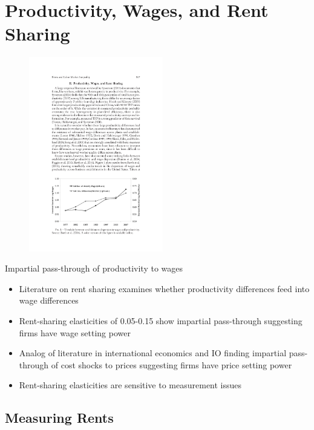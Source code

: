 \documentclass[notes=show]{beamer}
\begin{document}
\section{Productivity, Wages, and Rent Sharing}

\newpage
\begin{center}
\begin{figure}
\includegraphics[height=8.5cm,width=\textwidth]{figures/fig1.pdf}
\end{figure} 
\end{center}
\newpage

\begin{frame}{Impartial pass-through of productivity to wages}
\begin{itemize}
\item Literature on rent sharing examines whether productivity differences feed into wage differences \medskip
\item Rent-sharing elasticities of 0.05-0.15 show impartial pass-through suggesting firms have wage setting power \medskip
\item Analog of literature in international economics and IO finding impartial pass-through of cost shocks to prices suggesting firms have price setting power \medskip
\item Rent-sharing elasticities are sensitive to measurement issues
\end{itemize}
\end{frame}

\subsection*{Measuring Rents}
\end{document}
